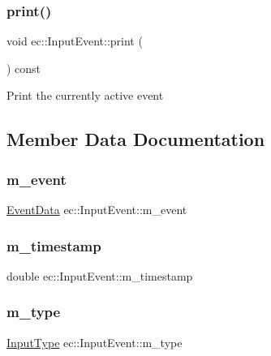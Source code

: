 \subsubsection{\texorpdfstring{print()}{print()}}
{\footnotesize\ttfamily void ec\+::\+Input\+Event\+::print (\begin{DoxyParamCaption}{ }\end{DoxyParamCaption}) const}

Print the currently active event 

\subsection{Member Data Documentation}
\mbox{\label{structec_1_1_input_event_a10c6d0183b009da26bac115528c3da36}} 
\subsubsection{\texorpdfstring{m\+\_\+event}{m\_event}}
{\footnotesize\ttfamily \mbox{\hyperlink{unionec_1_1_event_data}{Event\+Data}} ec\+::\+Input\+Event\+::m\+\_\+event}

\mbox{\label{structec_1_1_input_event_ada54908facf585cb714bd6712d8f6c4d}} 
\subsubsection{\texorpdfstring{m\+\_\+timestamp}{m\_timestamp}}
{\footnotesize\ttfamily double ec\+::\+Input\+Event\+::m\+\_\+timestamp}

\mbox{\label{structec_1_1_input_event_a07aadaf18da2952478b803bbd4122bb7}} 
\subsubsection{\texorpdfstring{m\+\_\+type}{m\_type}}
{\footnotesize\ttfamily \mbox{\hyperlink{namespaceec_ae2d697393ea83b34b18ab14eb5dacbca}{Input\+Type}} ec\+::\+Input\+Event\+::m\+\_\+type}

